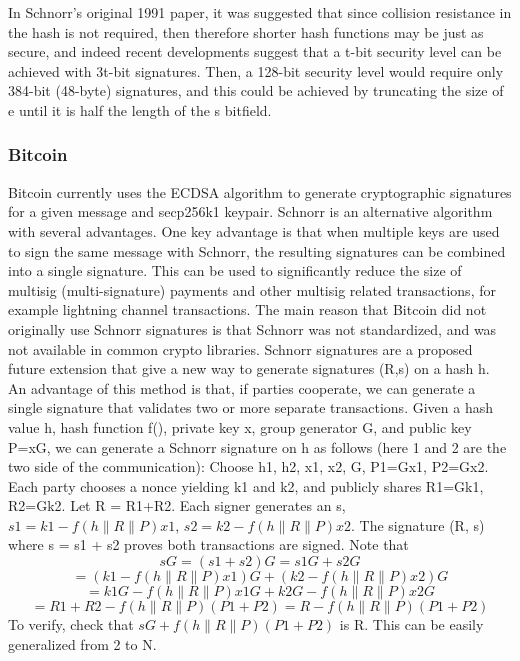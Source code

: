 \documentclass{article}
\begin{document}
In Schnorr's original 1991 paper, it was suggested that since collision resistance in the hash is not required, then therefore shorter hash functions may be just as secure, and indeed recent developments suggest that a t-bit security level can be achieved with 3t-bit signatures. Then, a 128-bit security level would require only 384-bit (48-byte) signatures, and this could be achieved by truncating the size of e until it is half the length of the s bitfield.

\subsubsection{Bitcoin}

Bitcoin currently uses the ECDSA algorithm to generate cryptographic signatures for a given message and secp256k1 keypair. Schnorr is an alternative algorithm with several advantages. One key advantage is that when multiple keys are used to sign the same message with Schnorr, the resulting signatures can be combined into a single signature. This can be used to significantly reduce the size of multisig (multi-signature) payments and other multisig related transactions, for example lightning channel transactions.
The main reason that Bitcoin did not originally use Schnorr signatures is that Schnorr was not standardized, and was not available in common crypto libraries.
Schnorr signatures are a proposed future extension that give a new way to generate signatures (R,s) on a hash h.
An advantage of this method is that, if parties cooperate, we can generate a single signature that validates two or more separate transactions.
Given a hash value h, hash function f(), private key x, group generator G, and public key P=xG, we can generate a Schnorr signature on h as follows (here 1 and 2 are the two side of the communication):
Choose h1, h2, x1, x2, G, P1=Gx1, P2=Gx2. Each party chooses a nonce yielding k1 and k2, and publicly shares R1=Gk1, R2=Gk2.
Let R = R1+R2. Each signer generates an s, $s1 = k1 - f(h \parallel R \parallel P)x1$, $s2 = k2 - f(h \parallel R \parallel P)x2$. The signature (R, s) where s = s1 + s2 proves both transactions are signed.
Note that \[sG = (s1 + s2)G = s1G + s2G \]
\[=(k1 - f(h \parallel R \parallel P)x1)G + (k2 - f(h \parallel R \parallel P)x2)G \]
\[=k1G - f(h \parallel R \parallel P)x1G + k2G - f(h \parallel R \parallel P)x2G \]
\[=R1 + R2 - f(h \parallel R \parallel P)(P1 + P2) = R - f(h \parallel R \parallel P)(P1 + P2)\]
To verify, check that $sG +f(h \parallel R \parallel P)(P1+P2)$ is R.
This can be easily generalized from 2 to N.
\end{document}
